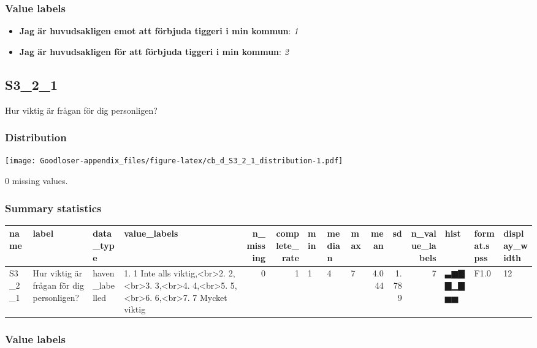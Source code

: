\documentclass[
]{book}
\providecommand{\tightlist}{%
  \setlength{\itemsep}{0pt}\setlength{\parskip}{0pt}}
\begin{document}
\hypertarget{S3_1_1_labels}{%
\subsubsection{Value labels}\label{S3_1_1_labels}}

\begin{itemize}
\tightlist
\item
  \textbf{Jag är huvudsakligen emot att förbjuda tiggeri i min kommun}: \emph{1}
\item
  \textbf{Jag är huvudsakligen för att förbjuda tiggeri i min kommun}: \emph{2}
\end{itemize}

\hypertarget{S3_2_1}{%
\subsection{S3\_2\_1}\label{S3_2_1}}

Hur viktig är frågan för dig personligen?

\hypertarget{S3_2_1_distribution}{%
\subsubsection{Distribution}\label{S3_2_1_distribution}}

\texttt{[image: Goodloser-appendix\_files/figure-latex/cb\_d\_S3\_2\_1\_distribution-1.pdf]}

0 missing values.

\hypertarget{S3_2_1_summary}{%
\subsubsection{Summary statistics}\label{S3_2_1_summary}}

\begin{tabular}{l|l|l|l|r|r|l|l|l|r|r|r|l|l|l}
\hline
name & label & data_type & value_labels & n_missing & complete_rate & min & median & max & mean & sd & n_value_labels & hist & format.spss & display_width\\
\hline
S3_2_1 & Hur viktig är frågan för dig personligen? & haven_labelled & 1. 1 Inte alls viktig,<br>2. 2,<br>3. 3,<br>4. 4,<br>5. 5,<br>6. 6,<br>7. 7 Mycket viktig & 0 & 1 & 1 & 4 & 7 & 4.044 & 1.789 & 7 & ▃▆▇▇▁▇▅▅ & F1.0 & 12\\
\hline
\end{tabular}

\hypertarget{S3_2_1_labels}{%
\subsubsection{Value labels}\label{S3_2_1_labels}}
\end{document}
